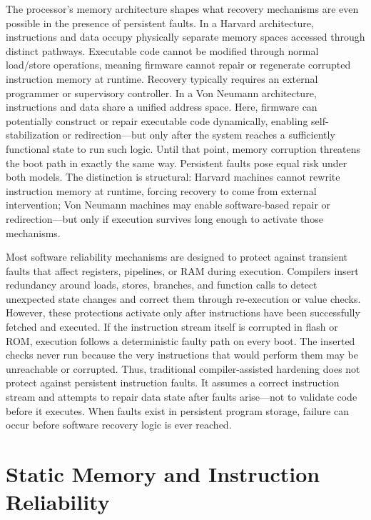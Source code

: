 The processor's memory architecture shapes what recovery mechanisms are even possible in the presence of persistent faults. In a Harvard architecture, instructions and data occupy physically separate memory spaces accessed through distinct pathways. Executable code cannot be modified through normal load/store operations, meaning firmware cannot repair or regenerate corrupted instruction memory at runtime. Recovery typically requires an external programmer or supervisory controller. In a Von Neumann architecture, instructions and data share a unified address space. Here, firmware can potentially construct or repair executable code dynamically, enabling self-stabilization or redirection---but only after the system reaches a sufficiently functional state to run such logic. Until that point, memory corruption threatens the boot path in exactly the same way. Persistent faults pose equal risk under both models. The distinction is structural: Harvard machines cannot rewrite instruction memory at runtime, forcing recovery to come from external intervention; Von Neumann machines may enable software-based repair or redirection---but only if execution survives long enough to activate those mechanisms.

Most software reliability mechanisms are designed to protect against transient faults that affect registers, pipelines, or RAM during execution. Compilers insert redundancy around loads, stores, branches, and function calls to detect unexpected state changes and correct them through re-execution or value checks. However, these protections activate only after instructions have been successfully fetched and executed. If the instruction stream itself is corrupted in flash or ROM, execution follows a deterministic faulty path on every boot. The inserted checks never run because the very instructions that would perform them may be unreachable or corrupted. Thus, traditional compiler-assisted hardening does not protect against persistent instruction faults. It assumes a correct instruction stream and attempts to repair data state after faults arise---not to validate code before it executes. When faults exist in persistent program storage, failure can occur before software recovery logic is ever reached.


\section{Static Memory and Instruction Reliability}
\label{sec:static-memory-instr-reliability}

